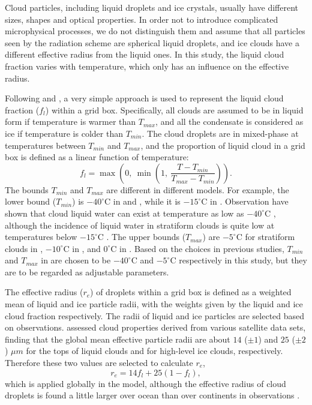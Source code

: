 Cloud particles, including liquid droplets and ice crystals, usually have different sizes, shapes and optical properties. In order not to introduce complicated microphysical processes, we do not distinguish them and assume that all particles seen by the radiation scheme are spherical liquid droplets, and ice clouds have a different effective radius from the liquid ones. In this study, the liquid cloud fraction varies with temperature, which only has an influence on the effective radius. %

Following \citet{Ose1993} and \citet{Boville2006}, a very simple approach is used to represent the liquid cloud fraction ($f_l$) within a grid box. Specifically, all clouds are assumed to be in liquid form if temperature is warmer than $T_{max}$, and all the condensate is considered as ice if temperature is colder than $T_{min}$. The cloud droplets are in mixed-phase at temperatures between $T_{min}$ and $T_{max}$, and the proportion of liquid cloud in a grid box is defined as a linear function of temperature:
\begin{equation}
	f_{l} =\max\left(0, ~\min\left(1, ~\frac{T-T_{min}}{T_{max}-T_{min}} \right)\right).
	\label{eq:liquid_frac}
\end{equation}
The bounds $T_{min}$ and $T_{max}$ are different in different models. For example, the lower bound ($T_{min}$) is $-40^{\circ}$C in \citet{Ose1993} and \citet{Boville2006}, while it is $-15^{\circ}$C  in \citet{Smith1990}. Observation have shown that cloud liquid water can exist at temperature as low as $-40^{\circ}$C \citep{Heymsfield1993}, although the incidence of liquid water in stratiform clouds is quite low at temperatures below $-15^{\circ}$C \citep{Ryan1996}. The upper bounds ($T_{max}$) are $-5^{\circ}$C for stratiform clouds in \citet{Ose1993}, $-10^{\circ}$C in \citet{Boville2006}, and $0^{\circ}$C in \citet{Smith1990}. Based on the choices in previous studies, $T_{min}$ and $T_{max}$ in  are chosen to be $-40^{\circ}$C and $-5^{\circ}$C respectively in this study, but they are to be regarded as adjustable parameters.

The effective radius ($r_{e}$) of droplets within a grid box is defined as a weighted mean of liquid and ice particle radii, with the weights given by the liquid and ice cloud fraction respectively. The radii of liquid and ice particles are selected based on observations. \citet{Stubenrauch2013} assessed cloud properties derived from various satellite data sets, finding that the global mean effective particle radii are about $14$ ($\pm1$) and $25$ ($\pm2$) $\mu m$ for the tops of liquid clouds and for high-level ice clouds, respectively. Therefore these two values are selected to calculate $r_e$,
\begin{equation}
	r_e = 14f_l + 25(1-f_l),
	\label{eq:Reff}
\end{equation}
which is applied globally in the model, although the effective radius of cloud droplets is found a little larger over ocean than over continents in observations \citep{Stubenrauch2013}.

